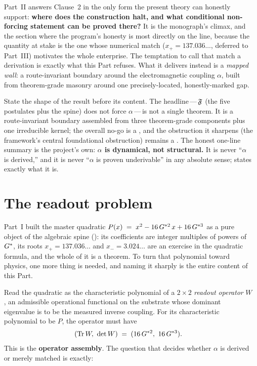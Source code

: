 \noindent Part~II answers Clause~2 in the only form the present theory can
honestly support: \textbf{where does the construction halt, and what conditional
non-forcing statement can be proved there?} It is the monograph's climax, and
the section where the program's honesty is most directly on the line, because
the quantity at stake is the one whose numerical match ($x_+ =
137.036\ldots$, deferred to Part~III) motivates the whole enterprise. The
temptation to call that match a derivation is exactly what this Part refuses.
What it delivers instead is a \emph{mapped wall}: a route-invariant boundary
around the electromagnetic coupling $\alpha$, built from theorem-grade masonry
around one precisely-located, honestly-marked  gap.

\medskip
\noindent State the shape of the result before its content. The headline\,---\,$\mathfrak{F}$
(the five postulates plus the spine) does not force $\alpha$\,---\,is not a single
theorem. It is a route-invariant boundary assembled from three theorem-grade
components plus one irreducible  kernel; the overall no-go is a
, and the obstruction it sharpens (the framework's central
foundational obstruction) remains a . The honest
one-line summary is the project's own: \textbf{$\alpha$ is dynamical, not
structural.} It is never ``$\alpha$ is derived,'' and it is never ``$\alpha$ is
proven underivable'' in any absolute sense;  states exactly
what it is.

\section{The readout problem}\label{sec:readout}
Part~I built the master quadratic $P(x) \;=\; x^{2} - 16\,G^{*2}\,x + 16\,G^{*3}$ as a pure object of the algebraic
spine (): its coefficients are integer multiples of powers
of $G^{*}$, its roots $x_+=137.036\ldots$ and $x_-=3.024\ldots$ are an exercise in
the quadratic formula, and the whole of it is a theorem. To turn that polynomial
toward physics, one more thing is needed, and naming it sharply is the entire
content of this Part.

 Read the quadratic as the characteristic polynomial of
a $2\times2$ \emph{readout operator} $W$, an admissible operational
functional on the substrate whose dominant eigenvalue is to be the measured
inverse coupling. For its characteristic polynomial to be $P$, the operator must
have
\[ (\operatorname{Tr} W,\ \det W) \;=\; (16\,G^{*2},\ 16\,G^{*3}). \]
This is the \textbf{operator assembly}. The question that decides whether
$\alpha$ is derived or merely matched is exactly:

